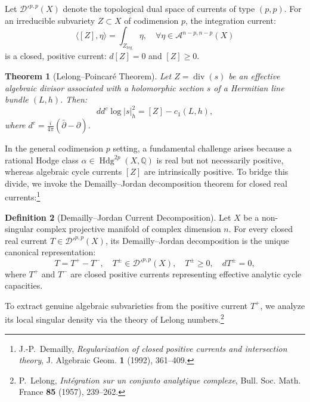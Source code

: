 \documentclass[11pt,a4paper]{article}
\theoremstyle{definition}
\newtheorem{definition}{Definition}[section]
\theoremstyle{plain}
\newtheorem{theorem}[definition]{Theorem}
\DeclareMathOperator{\Hdg}{Hdg}
\DeclareMathOperator{\Div}{div}
\begin{document}
Let $\mathcal{D}'^{p,p}(X)$ denote the topological dual space of currents of type $(p,p)$. For an irreducible subvariety $Z \subset X$ of codimension $p$, the integration current:
\begin{equation}
    \langle [Z], \eta \rangle = \int_{Z_{\mathrm{reg}}} \eta, \quad \forall \eta \in \mathcal{A}^{n-p, n-p}(X)
\end{equation}
is a closed, positive current: $d[Z] = 0$ and $[Z] \ge 0$.

\begin{theorem}[Lelong--Poincaré Theorem]
\label{thm:lelong_poincare}
Let $Z = \Div(s)$ be an effective algebraic divisor associated with a holomorphic section $s$ of a Hermitian line bundle $(L, h)$. Then:
\begin{equation}
    \label{eq:lelong_poincare}
    dd^c \log |s|_h^2 = [Z] - c_1(L, h),
\end{equation}
where $d^c = \frac{i}{4\pi} (\bar{\partial} - \partial)$.
\end{theorem}

In the general codimension $p$ setting, a fundamental challenge arises because a rational Hodge class $\alpha \in \Hdg^{2p}(X, \mathbb{Q})$ is real but not necessarily positive, whereas algebraic cycle currents $[Z]$ are intrinsically positive. To bridge this divide, we invoke the Demailly--Jordan decomposition theorem for closed real currents:\footnote{J.-P.~Demailly, \emph{Regularization of closed positive currents and intersection theory}, J. Algebraic Geom. \textbf{1} (1992), 361--409.}

\begin{definition}[Demailly--Jordan Current Decomposition]
\label{def:jordan_demailly_decomp}
Let $X$ be a non-singular complex projective manifold of complex dimension $n$. For every closed real current $T \in \mathcal{D}'^{p,p}(X)$, its Demailly--Jordan decomposition is the unique canonical representation:
\begin{equation}
    \label{eq:jordan_demailly}
    T = T^+ - T^-, \quad T^\pm \in \mathcal{D}'^{p,p}(X), \quad T^\pm \ge 0, \quad d T^\pm = 0,
\end{equation}
where $T^+$ and $T^-$ are closed positive currents representing effective analytic cycle capacities.
\end{definition}

To extract genuine algebraic subvarieties from the positive current $T^+$, we analyze its local singular density via the theory of Lelong numbers.\footnote{P.~Lelong, \emph{Intégration sur un conjunto analytique complexe}, Bull. Soc. Math. France \textbf{85} (1957), 239--262.}
\end{document}
